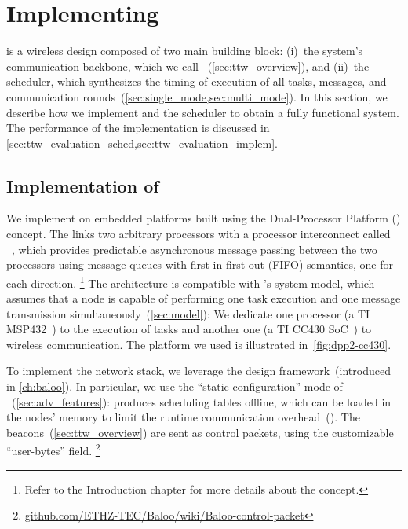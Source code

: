 
\section{Implementing \TTW}
\label{sec:ttw_implementation}

\TTW is a wireless \CPS design composed of two main building block:\linebreak
(i)~the system's communication backbone, which we call \TTnet ~(\cref{sec:ttw_overview}), and
(ii)~the \TTW scheduler, which synthesizes the timing of execution of all tasks, messages, and communication rounds~(\cref{sec:single_mode,sec:multi_mode}).
In this section, we describe how we implement \TTnet and the \TTW scheduler to obtain a fully functional \TTW system.
The performance of the implementation is discussed in \cref{sec:ttw_evaluation_sched,sec:ttw_evaluation_implem}.

\subsection{Implementation of \TTnet}
\label{subsec:implem_ttnet}

We implement \TTnet on embedded platforms built using the Dual-Processor Platform (\DPP) concept.
The \DPP links two arbitrary processors with a processor interconnect called \bolt~\cite{sutton2015Bolt}, which provides predictable asynchronous message passing between the two processors using message queues with first-in-first-out (FIFO) semantics, one for each direction.%
%
\footnote{Refer to the Introduction chapter for more details about the \DPP concept.}
%
The \DPP architecture is compatible with \TTW's system model, which assumes that a node is capable of performing one task execution and one message transmission simultaneously~(\cref{sec:model}):
We dedicate one processor (a TI MSP432~\cite{msp432}) to the execution of tasks and another one (a TI CC430 SoC~\cite{CC430F6137}) to wireless communication.
The \DPP platform we used is illustrated in~\cref{fig:dpp2-cc430}.

To implement the \TTnet network stack, we leverage the \baloo design framework~(introduced in \cref{ch:baloo}).
In particular, we use the ``static configuration'' mode of \baloo~(\cref{sec:adv_features}):
\TTW produces scheduling tables offline, which can be loaded in the nodes' memory to limit the runtime communication overhead~().
The \TTnet beacons~(\cref{sec:ttw_overview}) are sent as \baloo control packets, using the customizable ``user-bytes'' field.%
%
\footnote{\href{https://github.com/ETHZ-TEC/Baloo/wiki/Baloo-control-packet}{github.com/ETHZ-TEC/Baloo/wiki/Baloo-control-packet}}


